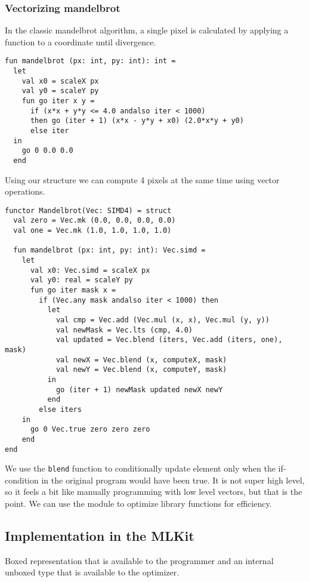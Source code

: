\documentclass{article}
\begin{document}
\subsubsection{Vectorizing mandelbrot}

In the classic mandelbrot algorithm, a single pixel is calculated by applying a function to a coordinate until divergence.

\begin{lstlisting}
fun mandelbrot (px: int, py: int): int =
  let
    val x0 = scaleX px
    val y0 = scaleY py
    fun go iter x y =
      if (x*x + y*y <= 4.0 andalso iter < 1000)
      then go (iter + 1) (x*x - y*y + x0) (2.0*x*y + y0)
      else iter
  in
    go 0 0.0 0.0
  end
\end{lstlisting}

Using our structure we can compute 4 pixels at the same time using vector operations.

\begin{lstlisting}
functor Mandelbrot(Vec: SIMD4) = struct
  val zero = Vec.mk (0.0, 0.0, 0.0, 0.0)
  val one = Vec.mk (1.0, 1.0, 1.0, 1.0)

  fun mandelbrot (px: int, py: int): Vec.simd =
    let
      val x0: Vec.simd = scaleX px
      val y0: real = scaleY py
      fun go iter mask x =
        if (Vec.any mask andalso iter < 1000) then
          let
            val cmp = Vec.add (Vec.mul (x, x), Vec.mul (y, y))
            val newMask = Vec.lts (cmp, 4.0)
            val updated = Vec.blend (iters, Vec.add (iters, one), mask)
            val newX = Vec.blend (x, computeX, mask)
            val newY = Vec.blend (x, computeY, mask)
          in
            go (iter + 1) newMask updated newX newY
          end
        else iters
    in
      go 0 Vec.true zero zero zero
    end
end
\end{lstlisting}

We use the \verb!blend! function to conditionally update element only when the if-condition in the original program would have been true. It is not super high level, so it feels a bit like manually programming with low level vectors, but that is the point. We can use the module to optimize library functions for efficiency.




\subsection{Implementation in the MLKit}

Boxed representation that is available to the programmer and an internal unboxed type that is available to the optimizer.
\end{document}
